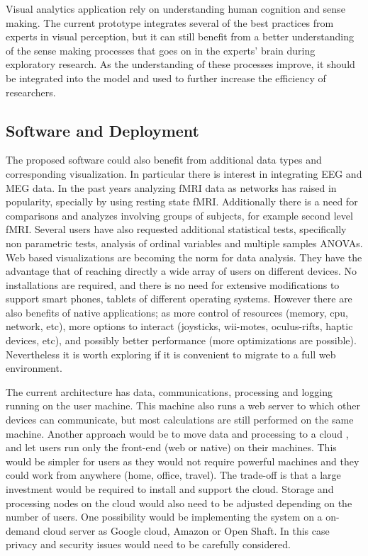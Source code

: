 {%
Visual analytics application rely on understanding human cognition and sense making. The current prototype integrates several of the best practices from experts in visual perception, but it can still benefit from a better understanding of the sense making processes that goes on in the experts' brain during exploratory research. As the understanding of these processes improve, it should be integrated into the model and used to further increase the efficiency of researchers.


\subsection{Software and Deployment}

The proposed software could also benefit from additional data types and corresponding visualization. In particular there is interest in integrating EEG and MEG data. In the past years analyzing fMRI data as networks has raised in popularity, specially by using resting state fMRI. Additionally there is a need for comparisons and analyzes involving groups of subjects, for example second level fMRI. Several users have also requested additional statistical tests, specifically non parametric tests, analysis of ordinal variables and multiple samples ANOVAs.  
Web based visualizations are becoming the norm for data analysis. They have the advantage that of reaching directly a wide array of users on different devices. No installations are required, and there is no need for extensive modifications to support smart phones, tablets of different operating systems. However there are also benefits of native applications; as more control of resources (memory, cpu, network, etc), more options to interact (joysticks, wii-motes, oculus-rifts, haptic devices, etc), and possibly better performance (more optimizations are possible). Nevertheless it is worth exploring if it is convenient to migrate to a full web environment.

The current architecture has data, communications, processing and logging running on the user machine. This machine also runs a web server to  which other devices can communicate, but most calculations are still performed on the same machine. Another approach would be to move data and processing to a cloud , and let users run only the front-end (web or native) on their machines. This would be simpler for users as they would not require powerful machines and they could work from anywhere (home, office, travel). The trade-off is that a large investment would be required  to install and support the cloud. Storage and processing nodes on the cloud would also need to be adjusted depending on the number of users. One possibility would be implementing the system on a on-demand cloud server as Google cloud, Amazon or Open Shaft. In this case privacy and security issues would need to be carefully considered. 

}
